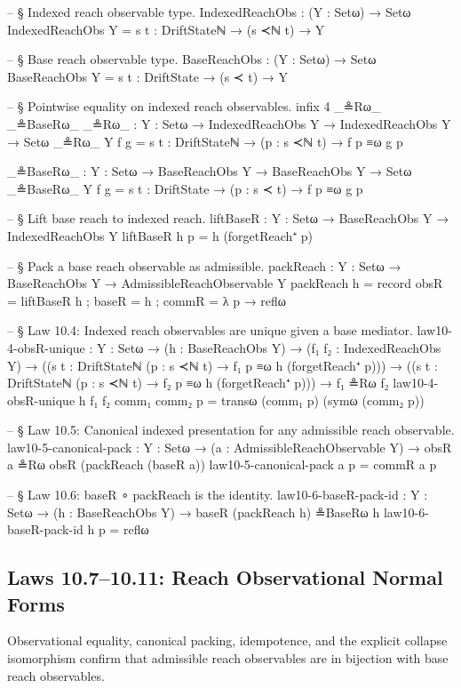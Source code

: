 \documentclass[11pt,a4paper]{book}
\begin{document}
\begin{code}
-- § Indexed reach observable type.
IndexedReachObs : (Y : Setω) → Setω
IndexedReachObs Y = {s t : DriftStateℕ} → (s ≺ℕ t) → Y

-- § Base reach observable type.
BaseReachObs : (Y : Setω) → Setω
BaseReachObs Y = {s t : DriftState} → (s ≺ t) → Y

-- § Pointwise equality on indexed reach observables.
infix 4 _≗Rω_ _≗BaseRω_
_≗Rω_ : {Y : Setω} → IndexedReachObs Y → IndexedReachObs Y → Setω
_≗Rω_ {Y} f g = {s t : DriftStateℕ} → (p : s ≺ℕ t) → f p ≡ω g p

_≗BaseRω_ : {Y : Setω} → BaseReachObs Y → BaseReachObs Y → Setω
_≗BaseRω_ {Y} f g = {s t : DriftState} → (p : s ≺ t) → f p ≡ω g p

-- § Lift base reach to indexed reach.
liftBaseR : {Y : Setω} → BaseReachObs Y → IndexedReachObs Y
liftBaseR h p = h (forgetReach⁺ p)

-- § Pack a base reach observable as admissible.
packReach : {Y : Setω} → BaseReachObs Y → AdmissibleReachObservable Y
packReach h = record
  { obsR  = liftBaseR h
  ; baseR = h
  ; commR = λ p → reflω
  }

-- § Law 10.4: Indexed reach observables are unique given a base mediator.
law10-4-obsR-unique :
  {Y : Setω} →
  (h : BaseReachObs Y) →
  (f₁ f₂ : IndexedReachObs Y) →
  (({s t : DriftStateℕ} (p : s ≺ℕ t) → f₁ p ≡ω h (forgetReach⁺ p))) →
  (({s t : DriftStateℕ} (p : s ≺ℕ t) → f₂ p ≡ω h (forgetReach⁺ p))) →
  f₁ ≗Rω f₂
law10-4-obsR-unique h f₁ f₂ comm₁ comm₂ p =
  transω (comm₁ p) (symω (comm₂ p))

-- § Law 10.5: Canonical indexed presentation for any admissible reach observable.
law10-5-canonical-pack :
  {Y : Setω} →
  (a : AdmissibleReachObservable Y) →
  obsR a ≗Rω obsR (packReach (baseR a))
law10-5-canonical-pack a p = commR a p

-- § Law 10.6: baseR ∘ packReach is the identity.
law10-6-baseR-pack-id :
  {Y : Setω} →
  (h : BaseReachObs Y) →
  baseR (packReach h) ≗BaseRω h
law10-6-baseR-pack-id h p = reflω
\end{code}

\subsection{Laws 10.7--10.11: Reach Observational Normal Forms}

Observational equality, canonical packing, idempotence, and the explicit collapse isomorphism confirm that admissible reach observables are in bijection with base reach observables.
\end{document}
